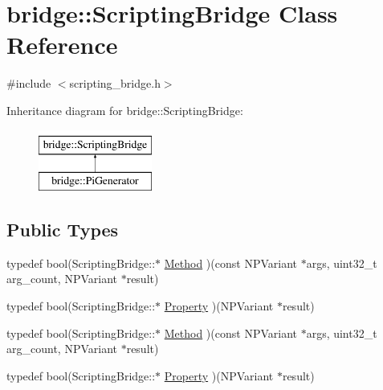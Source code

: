 \hypertarget{classbridge_1_1_scripting_bridge}{
\section{bridge::ScriptingBridge Class Reference}
\label{classbridge_1_1_scripting_bridge}
}


{\ttfamily \#include $<$scripting\_\-bridge.h$>$}

Inheritance diagram for bridge::ScriptingBridge:\begin{figure}[H]
\begin{center}
\leavevmode
\includegraphics[height=2cm]{classbridge_1_1_scripting_bridge}
\end{center}
\end{figure}
\subsection*{Public Types}
\begin{DoxyCompactItemize}
\item 
typedef bool(ScriptingBridge::$\ast$ \hyperlink{classbridge_1_1_scripting_bridge_aa2d60d52b4e91aa7659850b73f393727}{Method} )(const NPVariant $\ast$args, uint32\_\-t arg\_\-count, NPVariant $\ast$result)
\item 
typedef bool(ScriptingBridge::$\ast$ \hyperlink{classbridge_1_1_scripting_bridge_a9063ac1ad0b4e1a439e954e7a505057d}{Property} )(NPVariant $\ast$result)
\item 
typedef bool(ScriptingBridge::$\ast$ \hyperlink{classbridge_1_1_scripting_bridge_aa2d60d52b4e91aa7659850b73f393727}{Method} )(const NPVariant $\ast$args, uint32\_\-t arg\_\-count, NPVariant $\ast$result)
\item 
typedef bool(ScriptingBridge::$\ast$ \hyperlink{classbridge_1_1_scripting_bridge_a9063ac1ad0b4e1a439e954e7a505057d}{Property} )(NPVariant $\ast$result)
\end{DoxyCompactItemize}
